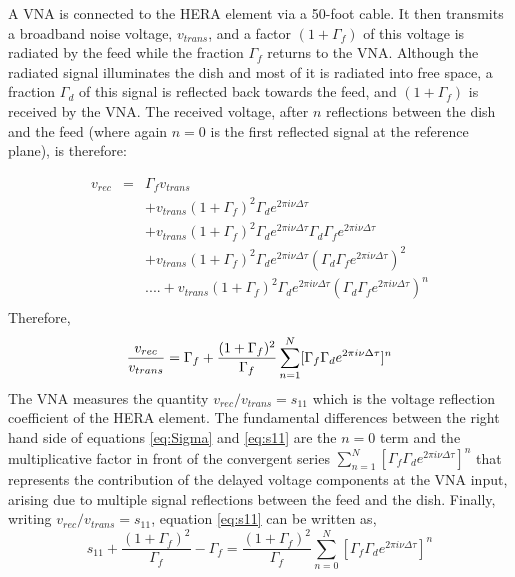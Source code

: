 \documentclass[twocolumn]{emulateapj}
\newcommand{\volt}{{v}}
\newcommand{\dfngexp}{{e^{2\pi i\nu \Delta \tau}}}
\begin{document}
 A VNA is connected to the HERA element via a 50-foot cable. It then transmits a broadband noise voltage, $\volt_{trans}$, and a factor $(1+\Gamma_f)$ of this voltage is radiated by the feed while the fraction $\Gamma_{f}$ returns to the VNA. Although the radiated signal illuminates the dish and most of it is radiated into free space, a fraction $\Gamma_d$ of this signal is reflected back towards the feed, and $(1+\Gamma_f)$ is received by the VNA.  The received voltage, after $n$ reflections between the dish and the feed (where again $n=0$ is the first reflected signal at the reference plane), is therefore:

\begin{eqnarray}
\volt_{rec} & = &  \Gamma_f \volt_{trans} \nonumber \\
         && + \volt_{trans} (1+\Gamma_f)^2 \Gamma_{d} \dfngexp \nonumber \\
         && + \volt_{trans} (1+\Gamma_f)^2 \Gamma_{d} \dfngexp \Gamma_d\Gamma_f\dfngexp \nonumber \\
         && + \volt_{trans} (1+\Gamma_f)^2 \Gamma_{d} \dfngexp (\Gamma_d\Gamma_f\dfngexp)^2 \nonumber \\
&&  ....+ \volt_{trans} (1+\Gamma_f)^2 \Gamma_{d} \dfngexp (\Gamma_d\Gamma_f\dfngexp)^n \nonumber \\
\label{eq8}
\end{eqnarray}
Therefore, 
\begin{equation}
{\volt_{rec}\over \volt_{trans} } = \Gamma_f + \frac{(1+\Gamma_f)^2}{\Gamma_{f}} \displaystyle\sum\limits_{n=1}^{N} [\Gamma_{f}\Gamma_{d}\dfngexp]^{n}
\label{eq9}
\end{equation}
The VNA measures the quantity $\volt_{rec}/\volt_{trans}=s_{11}$ which is the voltage reflection coefficient of the HERA element.
The fundamental differences between the right hand side of equations \ref{eq:Sigma} and \ref{eq:s11} are the $n=0$ term and the multiplicative factor in front of the convergent series $\displaystyle\sum\limits_{n=1}^{N} [\Gamma_{f}\Gamma_{d}\dfngexp]^{n}$ that represents the contribution of the delayed voltage components at the VNA input, arising due to multiple signal reflections between the feed and the dish. Finally, writing $\volt_{rec}/\volt_{trans}=s_{11}$, equation \ref{eq:s11} can be written as,
\begin{equation}
s_{11} +\frac{(1+\Gamma_f)^2}{\Gamma_f}-\Gamma_f = \frac{(1+\Gamma_f)^2}{\Gamma_{f}} \displaystyle\sum\limits_{n=0}^{N} [\Gamma_{f}\Gamma_{d}\dfngexp]^{n}
\label{eq10}
\end{equation}
\end{document}
